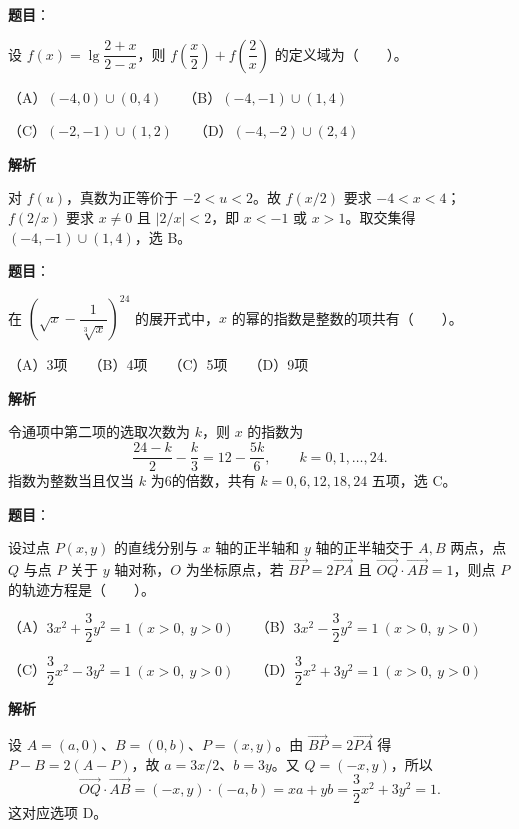 \begin{answer}

\textbf{题目}：

设 $f(x)=\lg\dfrac{2+x}{2-x}$，则 $f\left(\dfrac{x}{2}\right)+f\left(\dfrac{2}{x}\right)$ 的定义域为\mbox{（　　）}。

（A）$(-4,0)\cup(0,4)$　　（B）$(-4,-1)\cup(1,4)$

（C）$(-2,-1)\cup(1,2)$　　（D）$(-4,-2)\cup(2,4)$

\textbf{解析}

对 $f(u)$，真数为正等价于 $-2<u<2$。故 $f(x/2)$ 要求 $-4<x<4$；$f(2/x)$ 要求 $x\ne0$ 且 $|2/x|<2$，即 $x<-1$ 或 $x>1$。取交集得 $(-4,-1)\cup(1,4)$，选 B。


\end{answer}
\begin{answer}

\textbf{题目}：

在 $\left(\sqrt{x}-\dfrac{1}{\sqrt[3]{x}}\right)^{24}$ 的展开式中，$x$ 的幂的指数是整数的项共有\mbox{（　　）}。

（A）3项　　（B）4项　　（C）5项　　（D）9项

\textbf{解析}

令通项中第二项的选取次数为 $k$，则 $x$ 的指数为
\nopagebreak[4]
\[
\frac{24-k}{2}-\frac{k}{3}=12-\frac{5k}{6},\qquad k=0,1,\ldots,24.
\]
指数为整数当且仅当 $k$ 为6的倍数，共有 $k=0,6,12,18,24$ 五项，选 C。


\end{answer}
\begin{answer}

\textbf{题目}：

设过点 $P(x,y)$ 的直线分别与 $x$ 轴的正半轴和 $y$ 轴的正半轴交于 $A,B$ 两点，点 $Q$ 与点 $P$ 关于 $y$ 轴对称，$O$ 为坐标原点，若 $\overrightarrow{BP}=2\overrightarrow{PA}$ 且 $\overrightarrow{OQ}\cdot\overrightarrow{AB}=1$，则点 $P$ 的轨迹方程是\mbox{（　　）}。

（A）$3x^2+\dfrac32y^2=1\ (x>0,\ y>0)$　　（B）$3x^2-\dfrac32y^2=1\ (x>0,\ y>0)$

（C）$\dfrac32x^2-3y^2=1\ (x>0,\ y>0)$　　（D）$\dfrac32x^2+3y^2=1\ (x>0,\ y>0)$

\textbf{解析}

设 $A=(a,0)$、$B=(0,b)$、$P=(x,y)$。由 $\overrightarrow{BP}=2\overrightarrow{PA}$ 得 $P-B=2(A-P)$，故 $a=3x/2$、$b=3y$。又 $Q=(-x,y)$，所以
\nopagebreak[4]
\[
\overrightarrow{OQ}\cdot\overrightarrow{AB}=(-x,y)\cdot(-a,b)=xa+yb=\frac32x^2+3y^2=1.
\]
这对应选项 D。


\end{answer}
